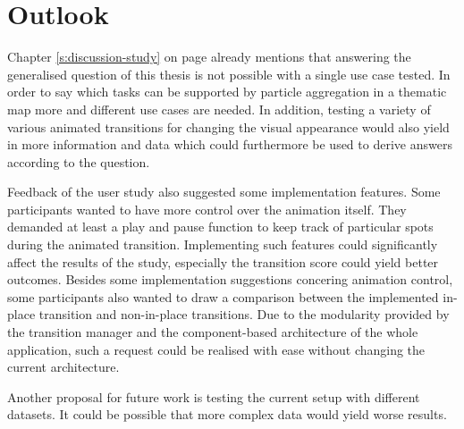 \section{Outlook}
\label{s:outlook}
Chapter \ref{s:discussion-study} on page \pageref{s:discussion-study} already mentions that answering the generalised question of this thesis is not possible with a single use case tested. In order to say which tasks can be supported by particle aggregation in a thematic map more and different use cases are needed. In addition, testing a variety of various animated transitions for changing the visual appearance would also yield in more information and data which could furthermore be used to derive answers according to the question.

Feedback of the user study also suggested some implementation features. Some participants wanted to have more control over the animation itself. They demanded at least a play and pause function to keep track of particular spots during the animated transition. Implementing such features could significantly affect the results of the study, especially the transition score could yield better outcomes. Besides some implementation suggestions concering animation control, some participants also wanted to draw a comparison between the implemented in-place transition and non-in-place transitions. Due to the modularity provided by the transition manager and the component-based architecture of the whole application, such a request could be realised with ease without changing the current architecture.

Another proposal for future work is testing the current setup with different datasets. It could be possible that more complex data would yield worse results.




